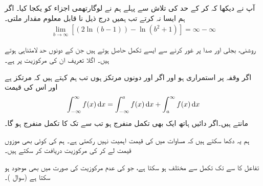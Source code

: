 آپ نے دیکھا کہ  کر کے حد کی تلاش سے پہلے ہم نے لوگارتھمی اجزاء کو یکجا کیا۔ اگر ہم ایسا نہ کرتے تب ہمیں درج ذیل نا قابل معلوم مقدار ملتی۔
\begin{align*}
\lim_{b\to \infty} [(2\ln(b-1))-\ln(b^2+1)]=\infty-\infty
\end{align*} 

روشنی، بجلی اور  صدا پر غور کرنے سے ایسے تکمل حاصل ہوتے ہیں جن کے دونوں حد لامتناہی ہوتے ہیں۔ اگلا تعریف ان کی مرکوزیت پر ہے۔

اگر وقفہ  پر  استمراری ہو اور اگر  اور  دونوں مرتکز ہوں تب ہم کہتے ہیں کہ  مرتکز ہے اور اس کی قیمت 
\begin{align}\label{مساوات_طریقہ_لامتناہی_حدود_کا_تکمل}
\int_{-\infty}^{\infty}f(x)\dif x=\int_{-\infty}^af(x)\dif x+\int_a^{\infty}f(x)\dif x
\end{align}
مانتے ہیں۔اگر دائیں ہاتھ ایک بھی تکمل منفرج ہو تب  سے  تک  کا تکمل منفرج ہو گا۔

ہم یہ دکھا سکتے ہیں کہ مساوات  میں  کی قیمت اہمیت نہیں رکھتی ہے۔ ہم  کی کوئی بھی موزوں قیمت لے کر   کی مرکوزیت دریافت کر سکتے ہیں۔

تفاعل  کا  سے  تک تکمل  سے مختلف ہو سکتا ہے، جو  کی عدم مرکوزیت کی صورت میں بھی موجود ہو سکتا ہے (سوال )۔


